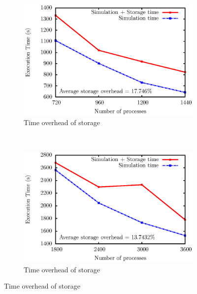 \begin{figure}
        \begin{subfigure}[b]{0.50\textwidth}
                \includegraphics[scale=0.50]{pictures/test41.ps}
                \caption{Time overhead of storage}
                \label{fig:over}
        \end{subfigure}
        ~
        \begin{subfigure}[b]{0.50\textwidth}
                \includegraphics[scale=0.50]{pictures/test42.ps}
                \caption{Time overhead of storage}
                \label{fig:204over}
        \end{subfigure}


\end{figure}
